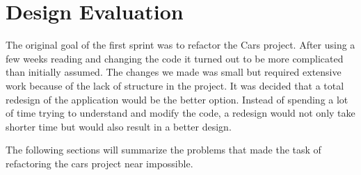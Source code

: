 \section{Design Evaluation}
The original goal of the first sprint was to refactor the Cars project. 
After using a few weeks reading and changing the code it turned out to be more complicated than initially assumed.
The changes we made was small but required extensive work because of the lack of structure in the project.
It was decided that a total redesign of the application would be the better option.
Instead of spending a lot of time trying to understand and modify the code, a redesign would not only take shorter time but would also result in a better design.

The following sections will summarize the problems that made the task of refactoring the cars project near impossible.